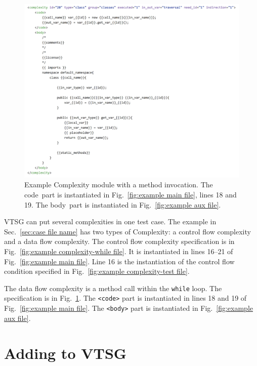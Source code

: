 \documentclass[12pt]{article}
\begin{document}
\begin{figure}[htbp]
  \includegraphics[width=\linewidth]{fig_Complexity_file_method.png}
  \caption{Example Complexity module with a method invocation.  
  The \texlangle code\texrangle\  part is instantiated in
  Fig.~\ref{fig:example main file}, lines 18 and 19. 
  The \texlangle body\texrangle\  part is instantiated in
  Fig.~\ref{fig:example aux file}.}
  \label{fig:example complexity-method file}
\end{figure}

VTSG can put several complexities in one test case.
The example in Sec.~\ref{sec:case file name} has two types of
Complexity: a control flow complexity and a data flow complexity. 
The control flow complexity specification is in 
Fig.~\ref{fig:example complexity-while file}.  It is instantiated in 
lines 16--21 of
Fig.~\ref{fig:example main file}.  Line 16 is the instantiation of 
the control flow condition
specified in Fig.~\ref{fig:example complexity-test file}.

The data flow complexity is a method call within the \verb|while| loop.  
The specification
is in Fig.~\ref{fig:example complexity-method file}.  
The \verb|<code>|
part is instantiated in lines 18 and 19 of 
Fig.~\ref{fig:example main file}. 
The \verb|<body>| part is instantiated in
Fig.~\ref{fig:example aux file}.


\section{Adding to VTSG}
\end{document}

